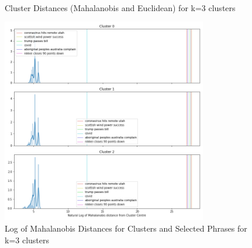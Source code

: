 \begin{appendices}
	\begin{figure}[H]
		\centering
		\\
		
		\caption{Cluster Distances (Mahalanobis and Euclidean) for k=3 clusters}
		\label{fig:distk3}
	\end{figure}
	
	\begin{figure}[H]
		\centering
		\includegraphics[width=0.8\textwidth]{images/words_kmeans_mahalanobis_distance_k=3.png}
		\caption{Log of Mahalanobis Distances for Clusters and Selected Phrases for k=3 clusters}
		\label{fig:wordsk3}
	\end{figure}

\end{appendices}
